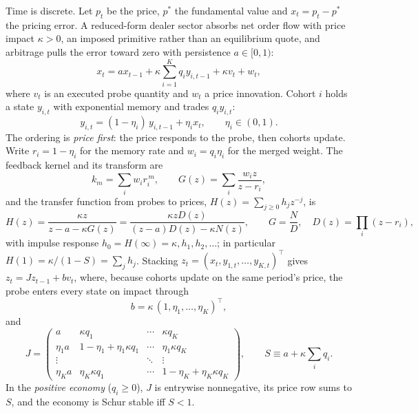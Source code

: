 \documentclass[12pt]{article}
\theoremstyle{definition}
\theoremstyle{remark}
\begin{document}
Time is discrete. Let $p_t$ be the price, $p^*$ the fundamental value and $x_t=p_t-p^*$ the pricing error. A reduced-form dealer sector absorbs net order flow with price impact $\kappa>0$, an imposed primitive rather than an equilibrium quote, and arbitrage pulls the error toward zero with persistence $a\in[0,1)$:
\begin{equation}\label{eq:price}
x_t = a x_{t-1} + \kappa \sum_{i=1}^K q_i y_{i,t-1} + \kappa v_t + w_t,
\end{equation}
where $v_t$ is an executed probe quantity and $w_t$ a price innovation. Cohort $i$ holds a state $y_{i,t}$ with exponential memory and trades $q_i y_{i,t}$:
\begin{equation}\label{eq:cohort}
y_{i,t} = (1-\eta_i)\,y_{i,t-1} + \eta_i x_t,\qquad \eta_i\in(0,1).
\end{equation}
The ordering is \emph{price first}: the price responds to the probe, then cohorts update. Write $r_i=1-\eta_i$ for the memory rate and $w_i=q_i\eta_i$ for the merged weight. The feedback kernel and its transform are
\begin{equation}\label{eq:kernel}
k_m=\sum_i w_i r_i^{\,m},\qquad G(z)=\sum_i \frac{w_i z}{z-r_i},
\end{equation}
and the transfer function from probes to prices, $H(z)=\sum_{j\ge0}h_jz^{-j}$, is
\begin{equation}\label{eq:H}
H(z)=\frac{\kappa z}{z-a-\kappa G(z)}=\frac{\kappa zD(z)}{(z-a)D(z)-\kappa N(z)},\qquad G=\frac ND,\quad D(z)=\prod_{i}(z-r_i),
\end{equation}
with impulse response $h_0=H(\infty)=\kappa,h_1,h_2,\ldots$; in particular $H(1)=\kappa/(1-S)=\sum_jh_j$. Stacking $z_t=(x_t,y_{1,t},\ldots,y_{K,t})^\top$ gives $z_t=Jz_{t-1}+bv_t$, where, because cohorts update on the same period's price, the probe enters every state on impact through
\begin{equation}\label{eq:b}
b=\kappa\,(1,\eta_1,\ldots,\eta_K)^\top ,
\end{equation}
and
\begin{equation}\label{eq:J}
J=\begin{pmatrix} a & \kappa q_1 & \cdots & \kappa q_K\\ \eta_1 a & 1-\eta_1+\eta_1\kappa q_1 & \cdots & \eta_1\kappa q_K\\ \vdots & & \ddots & \vdots\\ \eta_K a & \eta_K\kappa q_1 & \cdots & 1-\eta_K+\eta_K\kappa q_K\end{pmatrix},\qquad S\equiv a+\kappa\sum_i q_i .
\end{equation}
In the \emph{positive economy} ($q_i\ge0$), $J$ is entrywise nonnegative, its price row sums to $S$, and the economy is Schur stable iff $S<1$.
\end{document}
